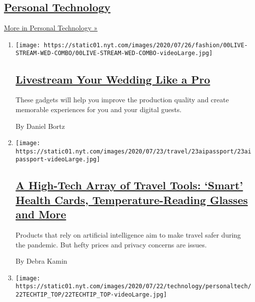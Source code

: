 \hypertarget{personal-technology}{%
\subsection{\texorpdfstring{\href{/section/technology/personaltech}{Personal
Technology}}{Personal Technology}}\label{personal-technology}}

\href{/section/technology/personaltech}{More in Personal Technology »}

\begin{enumerate}
\def\labelenumi{\arabic{enumi}.}
\item
  \texttt{[image: https://static01.nyt.com/images/2020/07/26/fashion/00LIVE-STREAM-WED-COMBO/00LIVE-STREAM-WED-COMBO-videoLarge.jpg]}

  \hypertarget{livestream-your-wedding-like-a-pro}{%
  \subsection{\texorpdfstring{\href{/2020/07/28/fashion/weddings/livestream-your-wedding-like-a-pro.html}{Livestream
  Your Wedding Like a
  Pro}}{Livestream Your Wedding Like a Pro}}\label{livestream-your-wedding-like-a-pro}}

  These gadgets will help you improve the production quality and create
  memorable experiences for you and your digital guests.

  By Daniel Bortz
\item
  \texttt{[image: https://static01.nyt.com/images/2020/07/23/travel/23aipassport/23aipassport-videoLarge.jpg]}

  \hypertarget{a-high-tech-array-of-travel-tools-smart-health-cards-temperature-reading-glasses-and-more}{%
  \subsection{\texorpdfstring{\href{/2020/07/23/travel/artificial-intelligence-coronavirus-passport.html}{A
  High-Tech Array of Travel Tools: `Smart' Health Cards,
  Temperature-Reading Glasses and
  More}}{A High-Tech Array of Travel Tools: `Smart' Health Cards, Temperature-Reading Glasses and More}}\label{a-high-tech-array-of-travel-tools-smart-health-cards-temperature-reading-glasses-and-more}}

  Products that rely on artificial intelligence aim to make travel safer
  during the pandemic. But hefty prices and privacy concerns are issues.

  By Debra Kamin
\item
  \texttt{[image: https://static01.nyt.com/images/2020/07/22/technology/personaltech/22TECHTIP\_TOP/22TECHTIP\_TOP-videoLarge.jpg]}


\end{enumerate}
